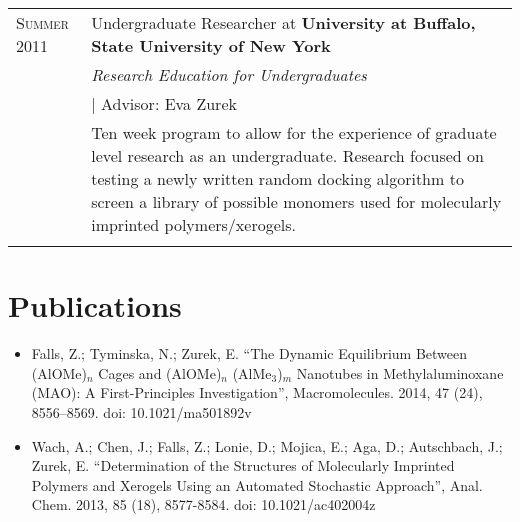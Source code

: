 \documentclass[letterpaper,10pt]{article} %
\begin{document}
\begin{tabular}{R{3cm}|p{13cm}}

\textsc{Summer 2011} & Undergraduate Researcher at \textbf{University at Buffalo, State University of New York} \\
& \emph{Research Education for Undergraduates} \\
& \hspace{3mm} \small | Advisor: Eva Zurek \\ 
& \footnotesize{Ten week program to allow for the experience of graduate level research as an undergraduate. Research focused on testing a newly written random docking algorithm to screen a library of possible monomers used for molecularly imprinted polymers/xerogels.}\\
 \\

\end{tabular}




\section{Publications}
\noindent

\begin{itemize}

    \item Falls, Z.; Tyminska, N.; Zurek, E. “The Dynamic Equilibrium Between (AlOMe)$_n$ Cages and (AlOMe)$_n$ \cdot (AlMe$_3$)$_m$ Nanotubes in Methylaluminoxane (MAO): A First-Principles Investigation”, Macromolecules. 2014, 47 (24), 8556–8569. doi: 10.1021/ma501892v

    \item Wach, A.; Chen, J.; Falls, Z.; Lonie, D.; Mojica, E.; Aga, D.; Autschbach, J.; Zurek, E. “Determination of the Structures of Molecularly Imprinted Polymers and Xerogels Using an Automated Stochastic Approach”, Anal. Chem. 2013, 85 (18), 8577-8584. doi: 10.1021/ac402004z

\end{itemize}



\end{document}
